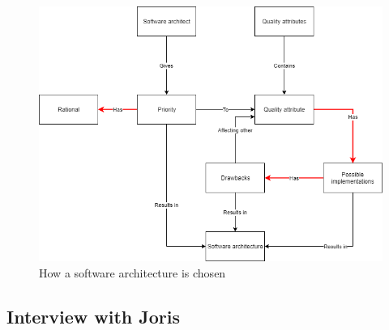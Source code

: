 \begin{figure}[H]
	\includegraphics[width=\linewidth]{creating_architecture.png}
	\caption{How a software architecture is chosen}
\end{figure}

\subsection{Interview with Joris}

